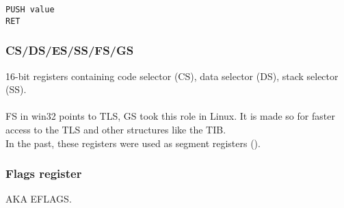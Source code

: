 \begin{lstlisting}
PUSH value
RET
\end{lstlisting}

\subsubsection{CS/DS/ES/SS/FS/GS}

16-bit registers containing code selector (CS), 
data selector (DS), stack selector (SS).\\
\\
FS in win32 points to \ac{TLS}, GS took this role in Linux.
It is made so for faster access to the \ac{TLS} and other structures like the \ac{TIB}.
\\
In the past, these registers were used as segment registers ().

\subsubsection{Flags register}
\label{EFLAGS}
\ac{AKA} EFLAGS.

